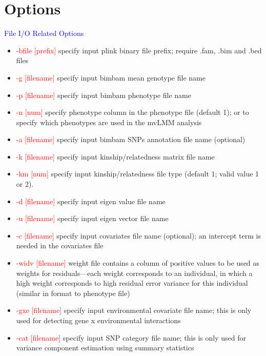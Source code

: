 \documentclass[11pt]{article}
\begin{document}
\clearpage
\newpage

\section{Options}

\textcolor{blue}{File I/O Related Options}
%
\begin{itemize}
\item \textcolor{red}{-bfile    [prefix]}          \quad specify input plink binary file prefix; require .fam, .bim and .bed files
\item \textcolor{red}{-g        [filename]}      \quad specify input bimbam mean genotype file name
\item  \textcolor{red}{-p        [filename]}      \quad specify input bimbam phenotype file name
\item  \textcolor{red}{-n        [num]}      \quad specify phenotype column in the phenotype file (default 1); or to specify which phenotypes are used in the mvLMM analysis
\item  \textcolor{red}{-a        [filename]}      \quad specify input bimbam SNPs annotation file name (optional)
\item  \textcolor{red}{ -k        [filename]}     \quad  specify input kinship/relatedness matrix file name
\item  \textcolor{red}{ -km       [num]}     \quad           specify input kinship/relatedness file type (default 1; valid value 1 or 2).
\item  \textcolor{red}{ -d        [filename]}     \quad  specify input eigen value file name
\item  \textcolor{red}{ -u        [filename]}     \quad  specify input eigen vector file name
\item  \textcolor{red}{ -c        [filename] }     \quad      specify input covariates file name (optional); an intercept term is needed in the covariates file
\item  \textcolor{red}{ -widv        [filename] }     \quad      weight file contains a column of positive values to be used as weights for residuals---each weight corresponds to an individual, in which a high weight corresponds to high residual error variance for this individual (similar in format to phenotype file)
\item  \textcolor{red}{ -gxe        [filename] }     \quad      specify input environmental covariate file name; this is only used for detecting gene x environmental interactions
\item  \textcolor{red}{ -cat        [filename] }     \quad      specify input SNP category file name; this is only used for variance component estimation using summary statistics

\end{itemize}
\end{document}
